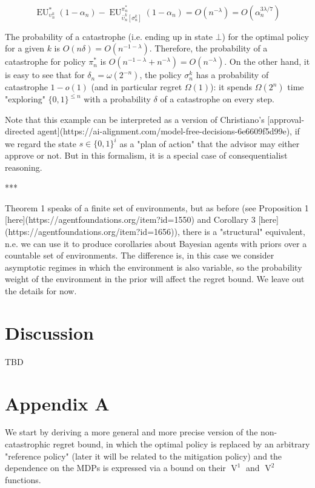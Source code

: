 \documentclass[a4paper]{article}
\newcommand{\Bool}{\{0,1\}}
\newcommand{\AP}[1]{\left(#1\right)}
\newcommand{\AB}[1]{\left[#1\right]}
\newcommand{\V}{\operatorname{V}}
\newcommand{\EU}{\operatorname{EU}}
\begin{document}
$$\EU_{\upsilon_n^k}^*(1-\alpha_n) - \EU_{\bar{\upsilon}_n^k\AB{\sigma_n^k}}^{\pi_n^*}(1-\alpha_n) = O\AP{n^{-\lambda}}=O\AP{\alpha_n^{3\lambda/7}}$$

The probability of a catastrophe (i.e. ending up in state $\bot$) for the optimal policy for a given $k$ is $O\AP{n\delta}=O\AP{n^{-1-\lambda}}$. Therefore, the probability of a catastrophe for policy $\pi_n^*$ is $O\AP{n^{-1-\lambda}+n^{-\lambda}}=O\AP{n^{-\lambda}}$. On the other hand, it is easy to see that for $\delta_n = \omega\AP{2^{-n}}$, the policy $\sigma_n^k$ has a probability of catastrophe $1-o(1)$ (and in particular  regret $\Omega(1)$): it spends $\Omega(2^n)$ time "exploring" $\Bool^{\leq n}$ with a probability $\delta$ of a catastrophe on every step.

Note that this example can be interpreted as a version of Christiano's [approval-directed agent](https://ai-alignment.com/model-free-decisions-6e6609f5d99e), if we regard the state $s \in \Bool^{i}$ as a "plan of action" that the advisor may either approve or not. But in this formalism, it is a special case of consequentialist reasoning.

***

Theorem 1 speaks of a finite set of environments, but as before (see Proposition 1 [here](https://agentfoundations.org/item?id=1550) and Corollary 3 [here](https://agentfoundations.org/item?id=1656)), there is a "structural" equivalent, n.e. we can use it to produce corollaries about Bayesian agents with priors over a countable set of environments. The difference is, in this case we consider asymptotic regimes in which the environment is also variable, so the probability weight of the environment in the prior will affect the regret bound. We leave out the details for now.

\section{Discussion}

TBD

\section{Appendix A}

We start by deriving a more general and more precise version of the non-catastrophic regret bound, in which the optimal policy is replaced by an arbitrary "reference policy" (later it will be related to the mitigation policy) and the dependence on the MDPs is expressed via a bound on their $\V^1$ and $\V^2$ functions.
\end{document}
